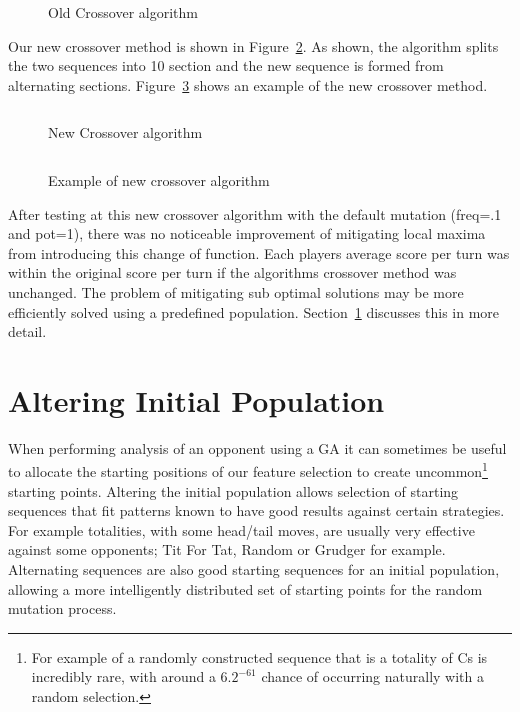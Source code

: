 \begin{figure}
    \inputminted{python}{code_snippets/oldCrossover.py}
    \caption{Old Crossover algorithm}\label{fig:oldCrossover}
\end{figure}

Our new crossover method is shown in Figure~\ref{fig:newCrossover}.
As shown, the algorithm splits the two sequences into 10 section and the new sequence is formed from alternating sections.
Figure~\ref{fig:newCrossoverEX} shows an example of the new crossover method.

\begin{figure}
    \inputminted{python}{code_snippets/newCrossover.py}
    \caption{New Crossover algorithm}\label{fig:newCrossover}
\end{figure}

\begin{figure}
    \inputminted{python}{code_snippets/newCrossoverEX.py}
    \caption{Example of new crossover algorithm}\label{fig:newCrossoverEX}
\end{figure}

After testing at this new crossover algorithm with the default mutation (freq=.1 and pot=1), there was no noticeable improvement of mitigating local maxima from introducing this change of function.
Each players average score per turn was within the original score per turn if the algorithms crossover method was unchanged.
The problem of mitigating sub optimal solutions may be more efficiently solved using a predefined population.
Section~\ref{sec:alteringinitialpopulation} discusses this in more detail.

\section{Altering Initial Population}\label{sec:alteringinitialpopulation}
When performing analysis of an opponent using a GA it can sometimes be useful to allocate the starting positions of our feature selection to create uncommon\footnote{For example of a randomly constructed sequence that is a totality of Cs is incredibly rare, with around a \(6.2^{-61}\) chance of occurring naturally with a random selection.} starting points.
Altering the initial population allows selection of starting sequences that fit patterns known to have good results against certain strategies.
For example totalities, with some head/tail moves, are usually very effective against some opponents;
Tit For Tat, Random or Grudger for example.
Alternating sequences are also good starting sequences for an initial population, allowing a more intelligently distributed set of starting points for the random mutation process.

